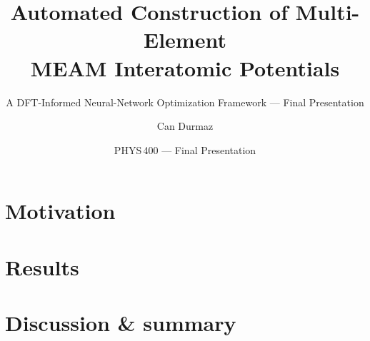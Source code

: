 \documentclass[aspectratio=169, 10pt]{beamer}
\title[MEAM-NN Final]{Automated Construction of Multi-Element\\MEAM Interatomic Potentials}
\subtitle{A DFT-Informed Neural-Network Optimization Framework --- Final Presentation}
\author{Can Durmaz}
\institute{METU --- Department of Physics}
\date{PHYS\,400 --- Final Presentation}
\begin{document}


\section{Motivation}






\section{Results}


\section{Discussion \& summary}


\end{document}
